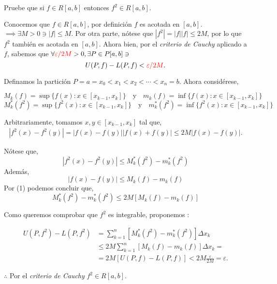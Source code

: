 




\begin{problema}
	Pruebe que si $f \in R[a, b]$ entonces $f^{2} \in R[a, b]$.
\end{problema}
\begin{dem}
	Conocemos que $f\in R[a,b]$, por definición $f$  es acotada en $[a,b]$. $\implies \exists M>0 \ni |f|\leq M$. Por otra parte, nótese que $|f^2|= |f||f|\leq 2M$, por lo que $f^2$ también es acotada en $[a,b]$. Ahora bien, por el \textit{criterio de Cauchy} aplicado a $f$, sabemos que $\forall \textcolor{red}{\varepsilon/2M}>0, \exists P\in P[a,b]\ni$ $$U(P, f)- L(P, f)<\textcolor{red}{\varepsilon/2M}.$$ 
	
	\linita 
	
	Definamos la partición $P = a=x_0<x_1<x_2<\cdots< x_n=b$. Ahora  considérese, 
	
	$$M_k(f)=\sup\{f(x):x\in [x_{k-1}, x_k]\}\quad \text{y} \quad  m_k(f)=\inf\{f(x):x\in [x_{k-1}, x_k]\}$$
	$$M_k^*(f^2)=\sup\{f^2(x):x\in [x_{k-1}, x_k]\}\quad \text{y} \quad  m_k^*(f^2)=\inf\{f^2(x):x\in [x_{k-1}, x_k]\}$$
	
	Arbitrariamente, tomamos $x,y\in [x_{k-1},x_k]$ tal que, 
	\begin{gather}
		\left|f^2(x)-f^2(y)\right|=|f(x)-f(y)||f(x)+f(y)|\leq 2 M|f(x)-f(y)|.
	\end{gather}

	
	Nótese que, 
	$$\left|f^2(x)-f^2(y)\right|\leq M_k^*(f^2)- m_k^*(f^2)$$
	Además, 
	$$\left|f(x)-f(y)\right|\leq M_k(f)- m_k(f)$$
	Por (1) podemos concluir que, 
	$$M_k^*(f^2)-m_k^*(f^2)\leq 2M[M_k(f)-m_k(f)]$$
	\linita 
	
	Como queremos comprobar que $f^2$ es integrable, proponemos :
	
	
	\begin{align*}
		U(P, f^2)-L(P, f^2) &= \sum_{k=1}^n \left[M_k^*(f^2)-m_k^*(f^2)\right]\Delta x_k\\
		&\leq 2M  \sum_{k=1}^n \left[M_k(f)-m_k(f)\right]\Delta x_k=\\
		&=2M\left[U(P, f)- L(P, f)\right]<2M\frac{\varepsilon}{2M}=\varepsilon. 
	\end{align*}

$\therefore$ Por el \textit{criterio de Cauchy} $f^2\in R[a,b]$. 
	
\end{dem}






